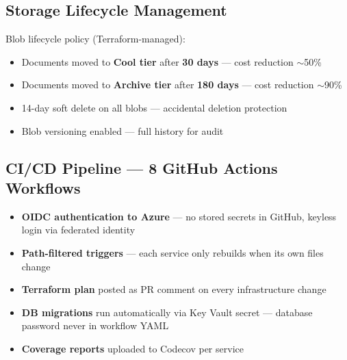 \documentclass[12pt,a4paper]{article}
\begin{document}
\subsection{Storage Lifecycle Management}

\begin{tcolorbox}[colback=LightBg, colframe=NordicGreen, boxrule=1pt, arc=4pt]
Blob lifecycle policy (Terraform-managed):
\begin{itemize}[leftmargin=*, itemsep=0pt]
  \item Documents moved to \textbf{Cool tier} after \textbf{30 days} — cost reduction $\sim$50\%
  \item Documents moved to \textbf{Archive tier} after \textbf{180 days} — cost reduction $\sim$90\%
  \item 14-day soft delete on all blobs — accidental deletion protection
  \item Blob versioning enabled — full history for audit
\end{itemize}
\end{tcolorbox}

\subsection{CI/CD Pipeline — 8 GitHub Actions Workflows}

\begin{center}
\end{center}

\begin{itemize}[leftmargin=*]
  \item \textbf{OIDC authentication to Azure} — no stored secrets in GitHub, keyless login via federated identity
  \item \textbf{Path-filtered triggers} — each service only rebuilds when its own files change
  \item \textbf{Terraform plan} posted as PR comment on every infrastructure change
  \item \textbf{DB migrations} run automatically via Key Vault secret — database password never in workflow YAML
  \item \textbf{Coverage reports} uploaded to Codecov per service
\end{itemize}
\end{document}
